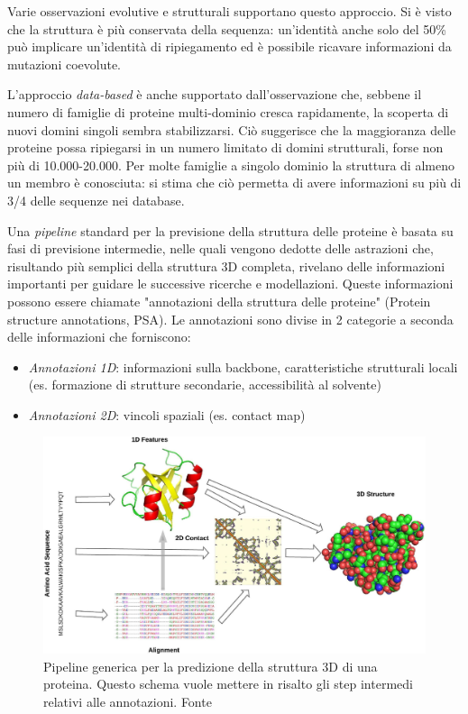 {\par Varie osservazioni evolutive e strutturali supportano questo approccio. Si è visto che la struttura è più conservata della sequenza: un'identità anche solo del 50\% può implicare un'identità di ripiegamento ed è possibile ricavare informazioni da mutazioni coevolute.

\par L'approccio \textit{data-based} è anche supportato dall'osservazione che, sebbene il numero di famiglie di proteine multi-dominio cresca rapidamente, la scoperta di nuovi domini singoli sembra stabilizzarsi. Ciò suggerisce che la maggioranza delle proteine possa ripiegarsi in un numero limitato di domini strutturali, forse non più di 10.000-20.000. Per molte famiglie a singolo dominio la struttura di almeno un membro è conosciuta: si stima che ciò permetta di avere informazioni su più di 3/4 delle sequenze nei database\supercite{alberts2018essential}. \\

\par Una \textit{pipeline} standard per la previsione della struttura delle proteine è basata su fasi di previsione intermedie, nelle quali vengono dedotte delle astrazioni che, risultando più semplici della struttura 3D completa, rivelano delle informazioni importanti per guidare le successive ricerche e modellazioni. Queste informazioni possono essere chiamate "annotazioni della struttura delle proteine" (Protein structure annotations, PSA). Le annotazioni sono divise in 2 categorie a seconda delle informazioni che forniscono:
\begin{itemize}
	\item \textit{Annotazioni 1D}: informazioni sulla backbone, caratteristiche strutturali locali (es. formazione di strutture secondarie, accessibilità al solvente)
	\item \textit{Annotazioni 2D}: vincoli spaziali (es. contact map)
\end{itemize}

\begin{figure}[!htb]
	\centering
	\includegraphics[scale=1]{images/psa.jpg}
	\caption{Pipeline generica per la predizione della struttura 3D di una proteina. Questo schema vuole mettere in risalto gli step intermedi relativi alle annotazioni. Fonte\cite{torrisi2020deep}}
	\label{fig:psa}
\end{figure}

}
